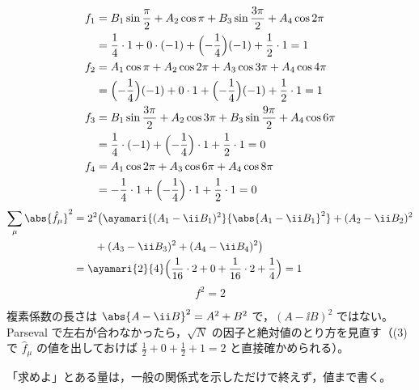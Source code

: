 \begin{align*}
  f_1&=B_1\sin\frac{\pi}{2}+A_2\cos\pi+B_3\sin\frac{3\pi}{2}+A_4\cos2\pi\\
  &=\frac{1}{4}\cdot1+0\cdot(-1)+\Bigl(-\frac{1}{4}\Bigr)(-1)+\frac{1}{2}\cdot1=1\\
  f_2&=A_1\cos\pi+A_2\cos2\pi+A_3\cos3\pi+A_4\cos4\pi\\
  &=\Bigl(-\frac{1}{4}\Bigr)(-1)+0\cdot1+\Bigl(-\frac{1}{4}\Bigr)(-1)+\frac{1}{2}\cdot1=1\\
  f_3&=B_1\sin\frac{3\pi}{2}+A_2\cos3\pi+B_3\sin\frac{9\pi}{2}+A_4\cos6\pi\\
  &=\frac{1}{4}\cdot(-1)+\Bigl(-\frac{1}{4}\Bigr)\cdot1+\frac{1}{2}\cdot1=0\\
  f_4&=A_1\cos2\pi+A_3\cos6\pi+A_4\cos8\pi\\
  &=-\frac{1}{4}\cdot1+\Bigl(-\frac{1}{4}\Bigr)\cdot1+\frac{1}{2}\cdot1=0
\end{align*}
\begin{align*}
  \sum_{\mu}\abs{\hat{f}_{\mu}}^{2}&=2^{2}\bigl(\ayamari{(A_1-\ii B_1)^{2}}{\abs{A_1-\ii B_1}^{2}}+(A_2-\ii B_2)^{2}\\
  &\qquad+(A_3-\ii B_3)^{2}+(A_4-\ii B_4)^{2}\bigr)\\
  &=\ayamari{2}{4}\Bigl(\frac{1}{16}\cdot2+0+\frac{1}{16}\cdot2+\frac{1}{4}\Bigr)=1
\end{align*}
\[ f^{2}=2 \]
\item 複素係数の長さは $\abs{A-\ii B}^{2}=A^{2}+B^{2}$ で，$(A-\ii B)^{2}$ ではない。Parseval で左右が合わなかったら，$\sqrt{N}$ の因子と絶対値のとり方を見直す（(3) で $\hat{f}_{\mu}$ の値を出しておけば $\frac{1}{2}+0+\frac{1}{2}+1=2$ と直接確かめられる）。
\item 「求めよ」とある量は，一般の関係式を示しただけで終えず，値まで書く。
